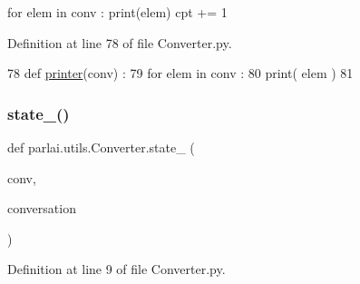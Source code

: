 for elem in conv \+: print(elem) cpt += 1 



Definition at line 78 of file Converter.\+py.


\begin{DoxyCode}
78 \textcolor{keyword}{def }\hyperlink{namespaceparlai_1_1utils_1_1Converter_a2ef9c241b22f84ea3a4123efd90f29b6}{printer}(conv) : 
79     \textcolor{keywordflow}{for} elem \textcolor{keywordflow}{in} conv : 
80         print( elem )
81 
\end{DoxyCode}
\mbox{\label{namespaceparlai_1_1utils_1_1Converter_a70095b67e171470e875dd9812d53fbc5}} 
\subsubsection{\texorpdfstring{state\+\_()}{state\_0()}}
{\footnotesize\ttfamily def parlai.\+utils.\+Converter.\+state\+\_ (\begin{DoxyParamCaption}\item[{}]{conv,  }\item[{}]{conversation }\end{DoxyParamCaption})}



Definition at line 9 of file Converter.\+py.


